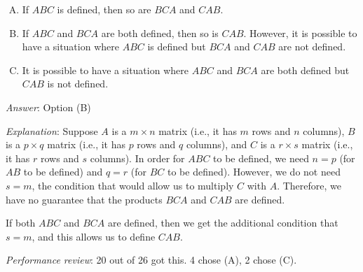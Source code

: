 \documentclass[10pt]{amsart}
\begin{document}
\begin{enumerate}
  \begin{enumerate}[(A)]
  \item If $ABC$ is defined, then so are $BCA$ and $CAB$.
  \item If $ABC$ and $BCA$ are both defined, then so is
    $CAB$. However, it is possible to have a situation where $ABC$ is
    defined but $BCA$ and $CAB$ are not defined.
  \item It is possible to have a situation where $ABC$ and $BCA$ are
    both defined but $CAB$ is not defined.
  \end{enumerate}

  {\em Answer}: Option (B)

  {\em Explanation}: Suppose $A$ is a $m \times n$ matrix (i.e., it
  has $m$ rows and $n$ columns), $B$ is a $p \times q$ matrix (i.e.,
  it has $p$ rows and $q$ columns), and $C$ is a $r \times s$ matrix
  (i.e., it has $r$ rows and $s$ columns). In order for $ABC$ to be
  defined, we need $n = p$ (for $AB$ to be defined) and $q = r$ (for
  $BC$ to be defined). However, we do not need $s = m$, the condition
  that would allow us to multiply $C$ with $A$. Therefore, we have no
  guarantee that the products $BCA$ and $CAB$ are defined.

  If both $ABC$ and $BCA$ are defined, then we get the additional
  condition that $s = m$, and this allows us to define $CAB$.

  {\em Performance review}: 20 out of 26 got this. 4 chose (A), 2
  chose (C).
\end{enumerate}
\end{document}
